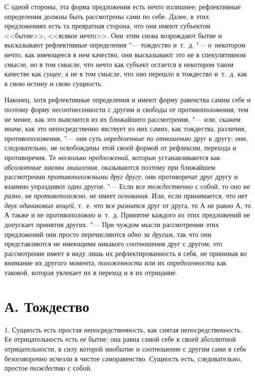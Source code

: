 С одной стороны, эта форма предложения есть нечто излишнее; рефлективные
определения должны быть рассмотрены сами по себе. Далее, в этих
предложениях есть та превратная сторона, что они имеют субъектом <<бытие>>,
<<всякое нечто>>. Они этим снова возрождают бытие и высказывают рефлективные
определения "--- тождество и~т.~д. "--- о~некотором нечто, как имеющееся в нем
качество, они высказывают это не в спекулятивном смысле, но в том смысле,
что нечто как субъект остается в некотором таком качестве как
{\em сущее}, а не в том смысле, что оно перешло в
тождество и~т.~д. как в свою истину и свою сущность.

Наконец, хотя рефлективные определения и имеют форму равенства самим себе и
поэтому форму несоотнесенности с другим и свободы от противоположения, тем
не менее, как это выяснится из их ближайшего рассмотрения, "--- или, скажем
иначе, как это непосредственно явствует из них самих, как тождества,
различия, противоположения, "--- они суть
{\em определенные по отношению }друг к другу; они,
следовательно, не освобождены этой своей формой от рефлексии, перехода и
противоречия. Те {\em несколько предложений}, которые
устанавливаются как {\em абсолютные законы мышления},
оказываются поэтому при ближайшем рассмотрении
{\em противоположными друг другу}; они противоречат
друг другу и взаимно упраздняют одно другое. "--- Если все
{\em тождественно} с собой, то оно не {\em разно}, не
{\em противоположно}, не имеет {\em основания}. Или, если принимается, что нет
{\em двух одинаковых вещей}, т.~е. что все
{\em разнится} друг от друга, то $А$ не равно
$А$, то $А$ также и не противоположно и~т.~д. Принятие
каждого из этих предложений не допускает принятия других. "--- При чуждом
мысли рассмотрении этих предложений они просто перечисляются
{\em одно за другим}, так что они представляются не
имеющими никакого соотношения друг с другом; это рассмотрение имеет в виду
лишь их рефлектированность в себя, не принимая во внимание их другого
момента, {\em положенности} или их
{\em определенности} как таковой, которая увлекает их в
переход и в их отрицание.

\section[А. Тождество]{А. Тождество}
1. Сущность есть простая непосредственность, как
снятая непосредственность. Ее отрицательность есть ее бытие; она равна
самой себе в своей абсолютной отрицательности, в силу которой инобытие и
соотношение с другим сами в себе безоговорочно исчезли в чистое
саморавенство. Сущность есть, следовательно, простое
{\em тождество} с собой.

